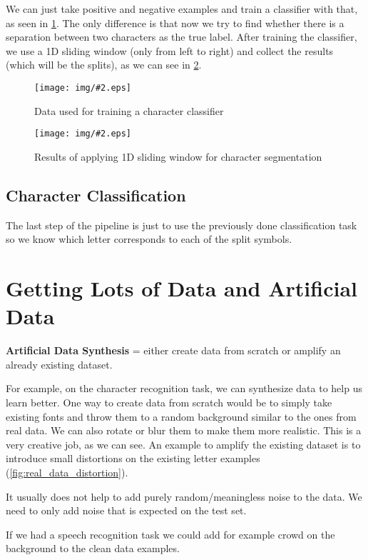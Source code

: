 \documentclass[10pt]{extarticle}
\newcommand{\stdfig}[3]{
    \begin{figure}
    \centering
    \texttt{[image: img/\#2.eps]}
    \caption{#3}
    \label{fig:#2}
    \end{figure}
}
\begin{document}
We can just take positive and negative examples and train a classifier
with that, as seen in \cref{fig:character_segmentation_training_data}.
The only difference is that now we try to find whether there is a
separation between two characters as the true label. After training the
classifier, we use a 1D sliding window (only from left to right) and
collect the results (which will be the splits), as we can see in
\cref{fig:character_segmentation_sliding_window}.

\stdfig{12cm}{character_segmentation_training_data}{Data used for training a character classifier}

\stdfig{8cm}{character_segmentation_sliding_window}{Results of applying 1D sliding window for character segmentation}

\subsection{Character Classification}\label{character-classification}

The last step of the pipeline is just to use the previously done
classification task so we know which letter corresponds to each of the
split symbols.

\section{Getting Lots of Data and Artificial
Data}\label{getting-lots-of-data-and-artificial-data}

\textbf{Artificial Data Synthesis} = either create data from scratch or
amplify an already existing dataset. \smallskip

For example, on the character recognition task, we can synthesize data
to help us learn better. One way to create data from scratch would be to
simply take existing fonts and throw them to a random background similar
to the ones from real data. We can also rotate or blur them to make them
more realistic. This is a very creative job, as we can see. An example
to amplify the existing dataset is to introduce small distortions on the
existing letter examples (\cref{fig:real_data_distortion}). \smallskip

It usually does not help to add purely random/meaningless noise to the
data. We need to only add noise that is expected on the test set.
\smallskip

If we had a speech recognition task we could add for example crowd on
the background to the clean data examples.
\end{document}
